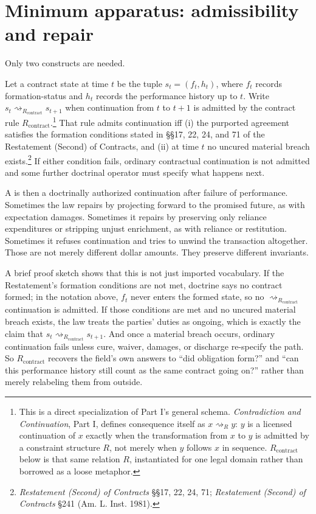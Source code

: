 \documentclass[11pt]{article}
\begin{document}
\section{Minimum apparatus: admissibility and repair}
Only two constructs are needed.

\begin{definition}
Let a contract state at time $t$ be the tuple $s_t=(f_t,h_t)$, where $f_t$ records formation-status and $h_t$ records the performance history up to $t$. Write $s_t \rightsquigarrow_{R_{\mathrm{contract}}} s_{t+1}$ when continuation from $t$ to $t+1$ is admitted by the contract rule $R_{\mathrm{contract}}$.\footnote{This is a direct specialization of Part I's general schema. \emph{Contradiction and Continuation}, Part I, defines consequence itself as $x \rightsquigarrow_R y$: $y$ is a licensed continuation of $x$ exactly when the transformation from $x$ to $y$ is admitted by a constraint structure $R$, not merely when $y$ follows $x$ in sequence. $R_{\mathrm{contract}}$ below is that same relation $R$, instantiated for one legal domain rather than borrowed as a loose metaphor.} That rule admits continuation iff (i) the purported agreement satisfies the formation conditions stated in \S\S 17, 22, 24, and 71 of the Restatement (Second) of Contracts, and (ii) at time $t$ no uncured material breach exists.\footnote{\textit{Restatement (Second) of Contracts} \S\S 17, 22, 24, 71; \textit{Restatement (Second) of Contracts} \S 241 (Am. L. Inst. 1981).} If either condition fails, ordinary contractual continuation is not admitted and some further doctrinal operator must specify what happens next.
\end{definition}

A \repair{} is then a doctrinally authorized continuation after failure of performance. Sometimes the law repairs by projecting forward to the promised future, as with expectation damages. Sometimes it repairs by preserving only reliance expenditures or stripping unjust enrichment, as with reliance or restitution. Sometimes it refuses continuation and tries to unwind the transaction altogether. Those are not merely different dollar amounts. They preserve different invariants.

A brief proof sketch shows that this is not just imported vocabulary. If the Restatement's formation conditions are not met, doctrine says no contract formed; in the notation above, $f_t$ never enters the formed state, so no $\rightsquigarrow_{R_{\mathrm{contract}}}$ continuation is admitted. If those conditions are met and no uncured material breach exists, the law treats the parties' duties as ongoing, which is exactly the claim that $s_t \rightsquigarrow_{R_{\mathrm{contract}}} s_{t+1}$. And once a material breach occurs, ordinary continuation fails unless cure, waiver, damages, or discharge re-specify the path. So $R_{\mathrm{contract}}$ recovers the field's own answers to ``did obligation form?'' and ``can this performance history still count as the same contract going on?'' rather than merely relabeling them from outside.
\end{document}
